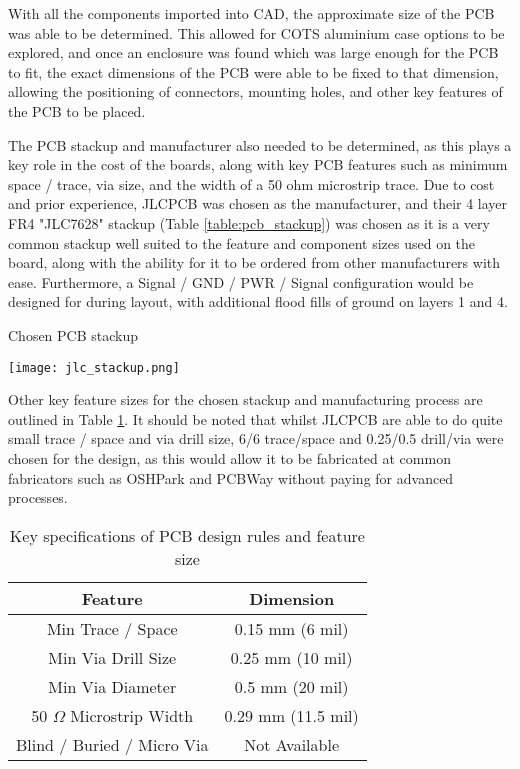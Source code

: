 With all the components imported into CAD, the approximate size of the PCB was able to be determined. This allowed for COTS aluminium case options to be explored, and once an enclosure was found which was large enough for the PCB to fit, the exact dimensions of the PCB were able to be fixed to that dimension, allowing the positioning of connectors, mounting holes, and other key features of the PCB to be placed. 

The PCB stackup and manufacturer also needed to be determined, as this plays a key role in the cost of the boards, along with key PCB features such as minimum space / trace, via size, and the width of a 50 ohm microstrip trace. Due to cost and prior experience, JLCPCB was chosen as the manufacturer, and their 4 layer FR4 "JLC7628" stackup (Table \ref{table:pcb_stackup}) was chosen as it is a very common stackup well suited to the feature and component sizes used on the board, along with the ability for it to be ordered from other manufacturers with ease. Furthermore, a Signal / GND / PWR / Signal configuration would be designed for during layout, with additional flood fills of ground on layers 1 and 4. 

\begin{table}[H]
	\centering
	\caption{Chosen PCB stackup}
	\texttt{[image: jlc\_stackup.png]}
	\label{table:pcb_stackup}
\end{table}

Other key feature sizes for the chosen stackup and manufacturing process are outlined in Table \ref{table:pcb_specs}. It should be noted that whilst JLCPCB are able to do quite small trace / space and via drill size, 6/6 trace/space and 0.25/0.5 drill/via were chosen for the design, as this would allow it to be fabricated at common fabricators such as OSHPark and PCBWay without paying for advanced processes. 
\begin{table}[H]
	\caption{Key specifications of PCB design rules and feature size}
	\label{table:pcb_specs}
	\centering
	\begin{tabular}{|c|c|}
		\hline
		\textbf{Feature}                          & \textbf{Dimension} \\ \hline
		Min Trace / Space                         & 0.15 mm (6 mil)   \\ \hline
		Min Via Drill Size                        & 0.25 mm (10 mil)     \\ \hline
		Min Via Diameter                          & 0.5 mm (20 mil)   \\ \hline
		50 $\Omega$ Microstrip Width              & 0.29 mm (11.5 mil) \\ \hline
		Blind / Buried / Micro Via                & Not Available \\ \hline
	\end{tabular}
\end{table} 


